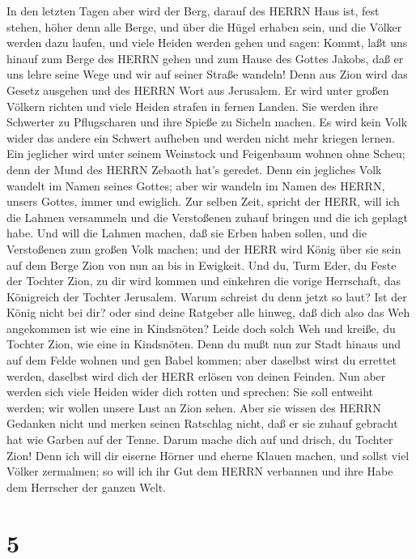  In den letzten Tagen aber wird der Berg, darauf des HERRN
Haus ist, fest stehen, höher denn alle Berge, und über die Hügel erhaben
sein, und die Völker werden dazu laufen,  und viele Heiden
werden gehen und sagen: Kommt, laßt uns hinauf zum Berge des HERRN gehen
und zum Hause des Gottes Jakobs, daß er uns lehre seine Wege und wir auf
seiner Straße wandeln! Denn aus Zion wird das Gesetz ausgehen und des
HERRN Wort aus Jerusalem.  Er wird unter großen Völkern
richten und viele Heiden strafen in fernen Landen. Sie werden ihre
Schwerter zu Pflugscharen und ihre Spieße zu Sicheln machen. Es wird
kein Volk wider das andere ein Schwert aufheben und werden nicht mehr
kriegen lernen.  Ein jeglicher wird unter seinem Weinstock
und Feigenbaum wohnen ohne Scheu; denn der Mund des HERRN Zebaoth hat's
geredet.  Denn ein jegliches Volk wandelt im Namen seines
Gottes; aber wir wandeln im Namen des HERRN, unsers Gottes, immer und
ewiglich.  Zur selben Zeit, spricht der HERR, will ich die
Lahmen versammeln und die Verstoßenen zuhauf bringen und die ich geplagt
habe.  Und will die Lahmen machen, daß sie Erben haben
sollen, und die Verstoßenen zum großen Volk machen; und der HERR wird
König über sie sein auf dem Berge Zion von nun an bis in Ewigkeit.
 Und du, Turm Eder, du Feste der Tochter Zion, zu dir wird
kommen und einkehren die vorige Herrschaft, das Königreich der Tochter
Jerusalem.  Warum schreist du denn jetzt so laut? Ist der
König nicht bei dir? oder sind deine Ratgeber alle hinweg, daß dich also
das Weh angekommen ist wie eine in Kindsnöten?  Leide doch
solch Weh und kreiße, du Tochter Zion, wie eine in Kindsnöten. Denn du
mußt nun zur Stadt hinaus und auf dem Felde wohnen und gen Babel kommen;
aber daselbst wirst du errettet werden, daselbst wird dich der HERR
erlösen von deinen Feinden.  Nun aber werden sich viele
Heiden wider dich rotten und sprechen: Sie soll entweiht werden; wir
wollen unsere Lust an Zion sehen.  Aber sie wissen des
HERRN Gedanken nicht und merken seinen Ratschlag nicht, daß er sie
zuhauf gebracht hat wie Garben auf der Tenne.  Darum mache
dich auf und drisch, du Tochter Zion! Denn ich will dir eiserne Hörner
und eherne Klauen machen, und sollst viel Völker zermalmen; so will ich
ihr Gut dem HERRN verbannen und ihre Habe dem Herrscher der ganzen Welt.

\hypertarget{section-4}{%
\section{5}\label{section-4}}

